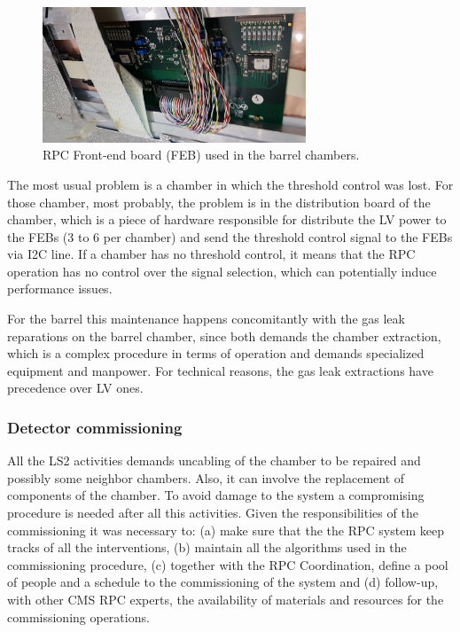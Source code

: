 \begin{figure}[h]
\begin{center}
\includegraphics[width=0.7\textwidth,keepaspectratio]{figures/rpc/rpc_feb.jpg}
\end{center}
\caption{RPC Front-end board (FEB) used in the barrel chambers.}\label{rpc_feb}
\end{figure}

The most usual problem is a chamber in which the threshold control was lost. For those chamber, most probably, the problem is in the distribution board of the chamber, which is a piece of hardware responsible for distribute the LV power to the FEBs (3 to 6 per chamber) and send the threshold control signal to the FEBs via I2C line. If a chamber has no threshold control, it means that the RPC operation has no control over the signal selection, which can potentially induce performance issues. 

For the barrel this maintenance happens concomitantly with the gas leak reparations on the barrel chamber, since both demands the chamber extraction, which is a complex procedure in terms of operation and demands specialized equipment and manpower. For technical reasons, the gas leak extractions have precedence over LV ones.



\subsubsection{Detector commissioning}
 
All the LS2 activities demands uncabling of the chamber to be repaired and possibly some neighbor chambers. Also, it can involve the replacement of components of the chamber. To avoid damage to the system a compromising procedure is needed after all this activities. Given the responsibilities of the commissioning it was necessary to: (a) make sure that the the RPC system keep tracks of all the interventions, (b) maintain all the algorithms used in the commissioning procedure, (c) together with the RPC Coordination, define a pool of people and a schedule to the commissioning of the system and (d) follow-up, with other CMS RPC experts, the availability of materials and resources for the commissioning operations.

